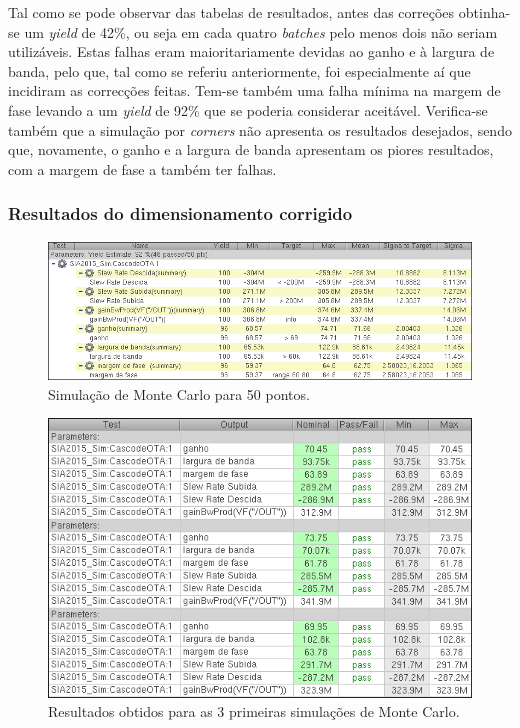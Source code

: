 \documentclass[11pt]{article}
\numberwithin{equation}{section}
\begin{document}
Tal como se pode observar das tabelas de resultados, antes das correções obtinha-se um \textit{yield} de 42\%, ou seja em cada quatro \textit{batches} pelo menos dois não seriam utilizáveis. Estas falhas eram maioritariamente devidas ao ganho e à largura de banda, pelo que, tal como se referiu anteriormente, foi especialmente aí que incidiram as correcções feitas. Tem-se também uma falha mínima na margem de fase levando a um \textit{yield} de 92\% que se poderia considerar aceitável. Verifica-se também que a simulação por \textit{corners} não apresenta os resultados desejados, sendo que, novamente, o ganho e a largura de banda apresentam os piores resultados, com a margem de fase a também ter falhas.

\subsubsection{Resultados do dimensionamento corrigido} 

\begin{figure}[H]
	\centering
	\includegraphics[keepaspectratio=true, scale=0.65]{exps/MonteCarlo_50pt_Novo}
	\vspace{-0.5em}
	\caption{Simulação de Monte Carlo para 50 pontos.}
	\vspace{-0.8em}
\end{figure} 

\begin{figure}[H]
	\centering
	\includegraphics[keepaspectratio=true, scale=0.65]{exps/MonteCarlo_3pt_Novo}
	\vspace{-0.5em}
	\caption{Resultados obtidos para as 3 primeiras simulações de Monte Carlo.}
	\vspace{-0.8em}
\end{figure} 
\end{document}
